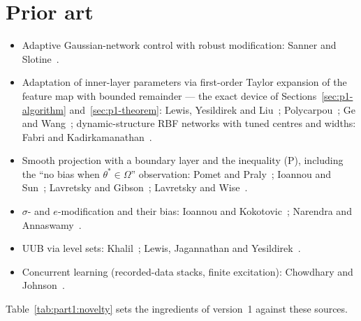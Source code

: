 \section{Prior art}\label{sec:p1-prior}

\begin{itemize}
\item Adaptive Gaussian-network control with robust modification: Sanner and Slotine~\cite{sanner1992}.
\item Adaptation of inner-layer parameters via first-order Taylor expansion of the feature map with bounded remainder
  --- the exact device of Sections~\ref{sec:p1-algorithm} and~\ref{sec:p1-theorem}: Lewis, Yesildirek and
  Liu~\cite{lewis1996}; Polycarpou~\cite{polycarpou1996}; Ge and Wang~\cite{ge2002}; dynamic-structure RBF networks
  with tuned centres and widths: Fabri and Kadirkamanathan~\cite{fabri1996}.
\item Smooth projection with a boundary layer and the inequality (P), including the ``no bias when
  $\theta^*\in\Omega$'' observation: Pomet and Praly~\cite{pp1992}; Ioannou and Sun~\cite[\S4.4]{ioannou1996};
  Lavretsky and Gibson~\cite{lavretsky2011}; Lavretsky and Wise~\cite[Ch.~11]{lavretsky2013}.
\item $\sigma$- and $e$-modification and their bias: Ioannou and Kokotovic~\cite{x-ioannou1983}; Narendra and
  Annaswamy~\cite{x-narendra1987}.
\item UUB via level sets: Khalil~\cite[Thm.~4.18]{khalil2002}; Lewis, Jagannathan and Yesildirek~\cite{lewis1999}.
\item Concurrent learning (recorded-data stacks, finite excitation): Chowdhary and
  Johnson~\cite{R11,x-chowdhary2011}.
\end{itemize}

Table~\ref{tab:part1:novelty} sets the ingredients of version~1 against these sources.

